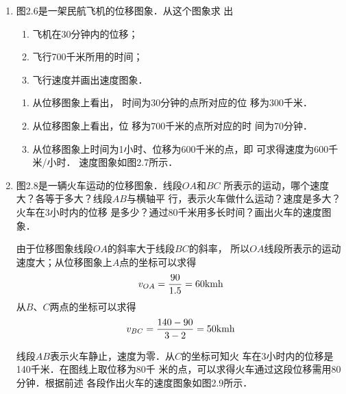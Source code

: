 \begin{enumerate}
    \item 图2.6是一架民航飞机的位移图象．从这个图象求
    出
    \begin{enumerate}
        \item 飞机在30分钟内的位移；
        \item 飞行700千米所用的时间；
        \item 飞行速度并画出速度图象．
    \end{enumerate}

\begin{solution}
\begin{enumerate}
    \item 从位移图象上看出，
    时间为30分钟的点所对应的位
    移为300千米．
    \item 从位移图象上看出，位
    移为700千米的点所对应的时
    间为70分钟．
    \item 从位移图象上时间为1小时、位移为600千米的点，即
    可求得速度为600千米/小时．
    速度图象如图2.7所示．
\end{enumerate}
\end{solution}

\item  图2.8是一辆火车运动的位移图象．线段$OA$和$BC$
所表示的运动，哪个速度大？各等于多大？线段$AB$与横轴平
行，表示火车做什么运动？速度是多大？火车在3小时内的位移
是多少？通过80千米用多长时间？画出火车的速度图象．

\begin{solution}
    由于位移图象线段$OA$的斜率大于线段$BC$的斜率，
    所以$OA$线段所表示的运动速度大；从位移图象上$A$点的坐标可以求得
\[v_{OA}=\frac{90}{1.5}=60{\rm kmh}\]
从$B$、$C$两点的坐标可以求得
\[v_{BC}=\frac{140-90}{3-2}=50{\rm kmh}\]

    线段$AB$表示火车静止，速度为零．从$C$的坐标可知火
    车在3小时内的位移是140千米．在图线上取位移为80千
    米的点，可以求得火车通过这段位移需用80分钟．根据前述
    各段作出火车的速度图象如图2.9所示．
\end{solution}

\begin{figure}[htp]\centering
    \begin{minipage}[t]{0.48\textwidth}
    \centering
{}
\end{minipage}
\end{figure}
\end{enumerate}
